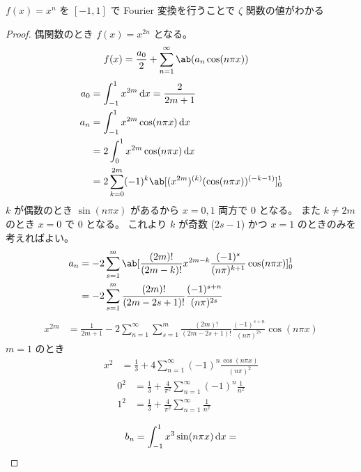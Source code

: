 \documentclass[uplatex,dvipdfmx,a4paper,11pt]{jlreq}
\begin{document}
\begin{theorem}
  $f(x) = x^n$ を $[-1, 1]$ で Fourier 変換を行うことで $\zeta$ 関数の値がわかる
\end{theorem}
\begin{proof}
  偶関数のとき $f(x) = x^{2n}$ となる。
  \begin{align}
    f(x) & = \frac{a_0}{2} + \sum_{n=1}^{\infty}\ab(a_n\cos(n\pi x))
  \end{align}
  \begin{align}
    a_0 & = \int_{-1}^{1}x^{2m}\dl{x} = \frac{2}{2m+1}                               \\
    a_n & = \int_{-1}^{1}x^{2m}\cos(n\pi x)\dl{x}                                    \\
        & = 2\int_{0}^{1}x^{2m}\cos(n\pi x)\dl{x}                                    \\
        & = 2\sum_{k=0}^{2m}(-1)^k\ab[(x^{2m})^{(k)}(\cos(n\pi x))^{(-k-1)}]_{0}^{1}
  \end{align}
  $k$ が偶数のとき $\sin(n\pi x)$ があるから $x = 0, 1$ 両方で $0$ となる。
  また $k \neq 2m$ のとき $x = 0$ で $0$ となる。
  これより $k$ が奇数 ($2s - 1$) かつ $x = 1$ のときのみを考えればよい。
  \begin{align}
    a_n & = -2\sum_{s=1}^{m}\ab[\frac{(2m)!}{(2m - k)!}x^{2m-k}\frac{(-1)^s}{(n\pi)^{k+1}}\cos(n\pi x)]_0^1 \\
        & = -2\sum_{s=1}^{m}\frac{(2m)!}{(2m - 2s + 1)!}\frac{(-1)^{s + n}}{(n\pi)^{2s}}
  \end{align}
  \begin{align}
    x^{2m} & = \frac{1}{2m+1} - 2\sum_{n=1}^{\infty}\sum_{s=1}^{m}\frac{(2m)!}{(2m - 2s + 1)!}\frac{(-1)^{s + n}}{(n\pi)^{2s}}\cos(n\pi x)
  \end{align}
  $m = 1$ のとき
  \begin{align}
    x^2 & = \frac{1}{3} + 4\sum_{n=1}^{\infty}(-1)^{n}\frac{\cos(n\pi x)}{(n\pi)^{2}}
  \end{align}
  \begin{align}
    0^2 & = \frac{1}{3} + \frac{4}{\pi^2}\sum_{n=1}^{\infty}(-1)^{n}\frac{1}{n^2} \\
    1^2 & = \frac{1}{3} + \frac{4}{\pi^2}\sum_{n=1}^{\infty}\frac{1}{n^2}
  \end{align}

  \begin{align}
    b_n = \int_{-1}^{1}x^3\sin(n\pi x)\dl{x} =
  \end{align}
\end{proof}
\end{document}
